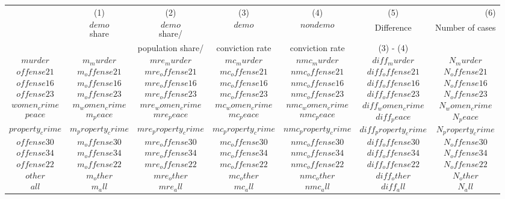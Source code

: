 {
\def\sym#1{\ifmmode^{#1}\else\(^{#1}\)\fi}
\begin{tabular}{lcccccr}
  \hline\hline
&\multicolumn{1}{c}{(1)}&\multicolumn{1}{c}{(2)}&\multicolumn{1}{c}{(3)}&\multicolumn{1}{c}{(4)}&\multicolumn{1}{c}{(5)}&\multicolumn{1}{r}{(6)}\\
&{$$demo$$ share}&{$$demo$$ share/}&{$$demo$$}&{$$nondemo$$} &  {Difference} & {Number of cases}\\
&{}&{population share/}&{conviction rate}&{conviction rate} & {(3) - (4)} & {}\\
\hline
$$murder$$ & $$m_murder$$ & $$mre_murder$$ & $$mc_murder$$ & $$nmc_murder$$ & $$diff_murder$$ & $$N_murder$$\\
$$offense21$$ & $$m_offense21$$ & $$mre_offense21$$ & $$mc_offense21$$ & $$nmc_offense21$$ & $$diff_offense21$$ & $$N_offense21$$\\
$$offense16$$ & $$m_offense16$$ & $$mre_offense16$$ & $$mc_offense16$$ & $$nmc_offense16$$ & $$diff_offense16$$ & $$N_offense16$$\\
$$offense23$$ & $$m_offense23$$ & $$mre_offense23$$ & $$mc_offense23$$ & $$nmc_offense23$$ & $$diff_offense23$$ & $$N_offense23$$\\
$$women_crime$$ & $$m_women_crime$$ & $$mre_women_crime$$ & $$mc_women_crime$$ & $$nmc_women_crime$$ & $$diff_women_crime$$ & $$N_women_crime$$\\
$$peace$$ & $$m_peace$$ & $$mre_peace$$ & $$mc_peace$$ & $$nmc_peace$$ & $$diff_peace$$ & $$N_peace$$\\
$$property_crime$$ & $$m_property_crime$$ & $$mre_property_crime$$ & $$mc_property_crime$$ & $$nmc_property_crime$$ & $$diff_property_crime$$ & $$N_property_crime$$\\
$$offense30$$ & $$m_offense30$$ & $$mre_offense30$$ & $$mc_offense30$$ & $$nmc_offense30$$ & $$diff_offense30$$ & $$N_offense30$$\\
$$offense34$$ & $$m_offense34$$ & $$mre_offense34$$ & $$mc_offense34$$ & $$nmc_offense34$$ & $$diff_offense34$$ & $$N_offense34$$\\
$$offense22$$ & $$m_offense22$$ & $$mre_offense22$$ & $$mc_offense22$$ & $$nmc_offense22$$ & $$diff_offense22$$ & $$N_offense22$$\\
$$other$$ & $$m_other$$ & $$mre_other$$ & $$mc_other$$ & $$nmc_other$$ & $$diff_other$$ & $$N_other$$\\
\hline
$$all$$ & $$m_all$$ & $$mre_all$$ & $$mc_all$$ & $$nmc_all$$ & $$diff_all$$ & $$N_all$$\\
\hline\hline
\end{tabular}
}

